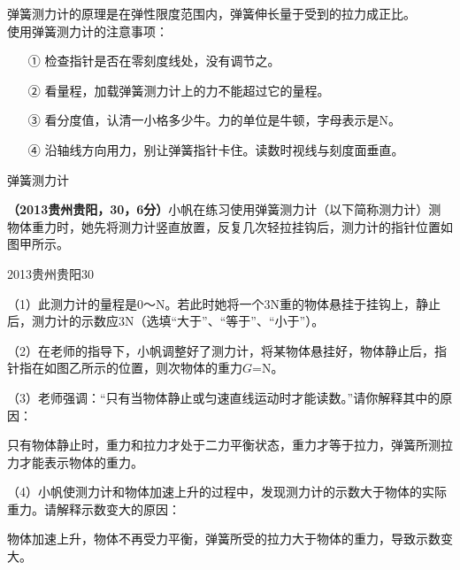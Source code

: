 \documentclass[12pt,twoside]{exam}
\begin{document}
\begin{knowledge}
\vspace{45pt}
\noindent
\begin{minipage}{\textwidth}
\begin{minipage}[c][6cm][c]{0.75\textwidth}
弹簧测力计的原理是在弹性限度范围内，弹簧伸长量于受到的拉力成正比。\\[10pt]

使用弹簧测力计的注意事项：
\begin{enumerate}
\item[①] 检查指针是否在零刻度线处，没有调节之。
\item[②] 看量程，加载弹簧测力计上的力不能超过它的量程。
\item[③] 看分度值，认清一小格多少牛。力的单位是牛顿，字母表示是N。
\item[④] 沿轴线方向用力，别让弹簧指针卡住。读数时视线与刻度面垂直。
\end{enumerate}
\end{minipage}\hfill
\begin{minipage}[c][6cm][c]{0.25\textwidth}
\begin{linefig}[0.7]{弹簧测力计}
\end{linefig}
\end{minipage} 
\end{minipage} 

\vspace{50pt}
\textbf{（2013贵州贵阳，30，6分）}小帆在练习使用弹簧测力计（以下简称测力计）测物体重力时，她先将测力计竖直放置，反复几次轻拉挂钩后，测力计的指针位置如图甲所示。
\begin{linefig}[0.8]{2013贵州贵阳30}
\end{linefig}
（1）此测力计的量程是0～\answerline*[5]N。若此时她将一个3N重的物体悬挂于挂钩上，静止后，测力计的示数应\answerline*[大于]3N（选填“大于”、“等于”、“小于”）。

（2）在老师的指导下，小帆调整好了测力计，将某物体悬挂好，物体静止后，指针指在如图乙所示的位置，则次物体的重力$G$=\answerline*[2.6]N。

（3）老师强调：“只有当物体静止或匀速直线运动时才能读数。”请你解释其中的原因：\begin{solutionorlines}[4em]
只有物体静止时，重力和拉力才处于二力平衡状态，重力才等于拉力，弹簧所测拉力才能表示物体的重力。
\end{solutionorlines}

（4）小帆使测力计和物体加速上升的过程中，发现测力计的示数大于物体的实际重力。请解释示数变大的原因：
\begin{solutionorbox}[4em]
物体加速上升，物体不再受力平衡，弹簧所受的拉力大于物体的重力，导致示数变大。
\end{solutionorbox}



\end{knowledge}
\end{document}
